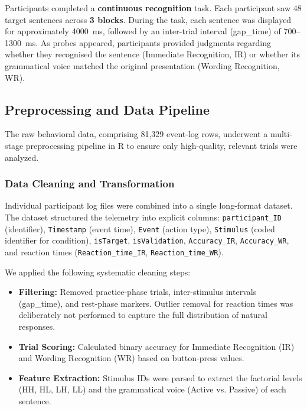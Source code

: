 \documentclass[12pt, a4paper]{article}
\begin{document}
Participants completed a \textbf{continuous recognition} task. Each participant saw 48 target sentences across \textbf{3 blocks}. During the task, each sentence was displayed for approximately 4000~ms, followed by an inter-trial interval (gap\_time) of 700--1300~ms. As probes appeared, participants provided judgments regarding whether they recognised the sentence (Immediate Recognition, IR) or whether its grammatical voice matched the original presentation (Wording Recognition, WR).

\subsection{Preprocessing and Data Pipeline}

The raw behavioral data, comprising 81,329 event-log rows, underwent a multi-stage preprocessing pipeline in R to ensure only high-quality, relevant trials were analyzed.

\subsubsection{Data Cleaning and Transformation}

Individual participant log files were combined into a single long-format dataset. The dataset structured the telemetry into explicit columns: \texttt{participant\_ID} (identifier), \texttt{Timestamp} (event time), \texttt{Event} (action type), \texttt{Stimulus} (coded identifier for condition), \texttt{isTarget}, \texttt{isValidation}, \texttt{Accuracy\_IR}, \texttt{Accuracy\_WR}, and reaction times (\texttt{Reaction\_time\_IR}, \texttt{Reaction\_time\_WR}).

We applied the following systematic cleaning steps:
\begin{itemize}[noitemsep]
    \item \textbf{Filtering:} Removed practice-phase trials, inter-stimulus intervals (gap\_time), and rest-phase markers. Outlier removal for reaction times was deliberately not performed to capture the full distribution of natural responses.
    \item \textbf{Trial Scoring:} Calculated binary accuracy for Immediate Recognition (IR) and Wording Recognition (WR) based on button-press values.
    \item \textbf{Feature Extraction:} Stimulus IDs were parsed to extract the factorial levels (HH, HL, LH, LL) and the grammatical voice (Active vs. Passive) of each sentence.
\end{itemize}
\end{document}
